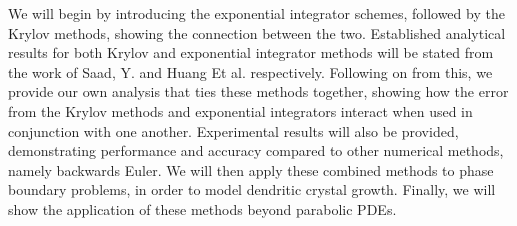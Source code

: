 We will begin by introducing the exponential integrator schemes, followed by the Krylov methods, showing the connection between the two.
Established analytical results for both Krylov and exponential integrator methods will be stated from the work of Saad, Y. \cite{Saad1992} and Huang Et al. \cite{Huang2022} respectively.
Following on from this, we provide our own analysis that ties these methods together, showing how the error from the Krylov methods and exponential integrators interact when used in conjunction with one another.
Experimental results will also be provided, demonstrating performance and accuracy compared to other numerical methods, namely backwards Euler.
We will then apply these combined methods to phase boundary problems, in order to model dendritic crystal growth.
Finally, we will show the application of these methods beyond parabolic PDEs.